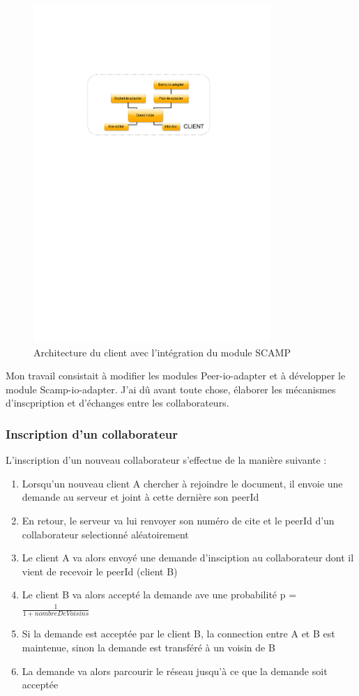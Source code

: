 \documentclass{tnreport}
\begin{document}
\begin{figure}[!h]
  \centering
  \includegraphics[width=9cm]{figures/MUTE-archi-scamp}
  \caption{Architecture du client avec l'intégration du module SCAMP}
  \label{fig:mute-archi-scamp}
\end{figure}

Mon travail consistait à modifier les modules Peer-io-adapter et à développer le module Scamp-io-adapter. J'ai dû avant toute chose, élaborer les mécanismes d'inscpription et d'échanges entre les collaborateurs.

\subsubsection{Inscription d'un collaborateur}
L'inscription d'un nouveau collaborateur s'effectue de la manière suivante :
\begin{enumerate}
  \item Lorsqu'un nouveau client A chercher à rejoindre le document, il envoie une demande au serveur et joint à cette dernière son peerId
  \item En retour, le serveur va lui renvoyer son numéro de cite et le peerId d'un collaborateur selectionné aléatoirement
  \item Le client A va alors envoyé une demande d'insciption au collaborateur dont il vient de recevoir le peerId (client B)
  \item Le client B va alors accepté la demande ave une probabilité p = $\frac{1}{1 + nombreDeVoisins}$
  \item Si la demande est acceptée par le client B, la connection entre A et B est maintenue, sinon la demande est transféré à un voisin de B
  \item La demande va alors parcourir le réseau jusqu'à ce que la demande soit acceptée\\
\end{enumerate}
\end{document}
